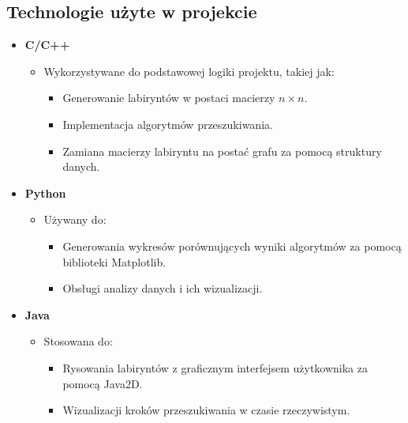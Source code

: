 \documentclass{article}
\begin{document}
\subsection{Technologie użyte w projekcie}
\begin{itemize}
    \item \textbf{C/C++}
    \begin{itemize}
        \item Wykorzystywane do podstawowej logiki projektu, takiej jak:
        \begin{itemize}
            \item Generowanie labiryntów w postaci macierzy \(n \times n\).
            \item Implementacja algorytmów przeszukiwania.
            \item Zamiana macierzy labiryntu na postać grafu za pomocą struktury danych.
        \end{itemize}
    \end{itemize}
    
    \item \textbf{Python}
    \begin{itemize}
        \item Używany do:
        \begin{itemize}
            \item Generowania wykresów porównujących wyniki algorytmów za pomocą biblioteki Matplotlib.
            \item Obsługi analizy danych i ich wizualizacji.
        \end{itemize}
    \end{itemize}
    
    \item \textbf{Java}
    \begin{itemize}
        \item Stosowana do:
        \begin{itemize}
            \item Rysowania labiryntów z graficznym interfejsem użytkownika za pomocą Java2D.
            \item Wizualizacji kroków przeszukiwania w czasie rzeczywistym.
        \end{itemize}
    \end{itemize}
    

\end{itemize}
\end{document}
